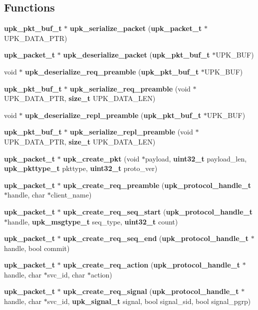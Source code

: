 \subsection*{Functions}
\begin{DoxyCompactItemize}
\item 
{\bf upk\_\-pkt\_\-buf\_\-t} $\ast$ {\bf upk\_\-serialize\_\-packet} ({\bf upk\_\-packet\_\-t} $\ast$UPK\_\-DATA\_\-PTR)
\item 
{\bf upk\_\-packet\_\-t} $\ast$ {\bf upk\_\-deserialize\_\-packet} ({\bf upk\_\-pkt\_\-buf\_\-t} $\ast$UPK\_\-BUF)
\item 
void $\ast$ {\bf upk\_\-deserialize\_\-req\_\-preamble} ({\bf upk\_\-pkt\_\-buf\_\-t} $\ast$UPK\_\-BUF)
\item 
{\bf upk\_\-pkt\_\-buf\_\-t} $\ast$ {\bf upk\_\-serialize\_\-req\_\-preamble} (void $\ast$UPK\_\-DATA\_\-PTR, {\bf size\_\-t} UPK\_\-DATA\_\-LEN)
\item 
void $\ast$ {\bf upk\_\-deserialize\_\-repl\_\-preamble} ({\bf upk\_\-pkt\_\-buf\_\-t} $\ast$UPK\_\-BUF)
\item 
{\bf upk\_\-pkt\_\-buf\_\-t} $\ast$ {\bf upk\_\-serialize\_\-repl\_\-preamble} (void $\ast$UPK\_\-DATA\_\-PTR, {\bf size\_\-t} UPK\_\-DATA\_\-LEN)
\item 
{\bf upk\_\-packet\_\-t} $\ast$ {\bf upk\_\-create\_\-pkt} (void $\ast$payload, {\bf uint32\_\-t} payload\_\-len, {\bf upk\_\-pkttype\_\-t} pkttype, {\bf uint32\_\-t} proto\_\-ver)
\item 
{\bf upk\_\-packet\_\-t} $\ast$ {\bf upk\_\-create\_\-req\_\-preamble} ({\bf upk\_\-protocol\_\-handle\_\-t} $\ast$handle, char $\ast$client\_\-name)
\item 
{\bf upk\_\-packet\_\-t} $\ast$ {\bf upk\_\-create\_\-req\_\-seq\_\-start} ({\bf upk\_\-protocol\_\-handle\_\-t} $\ast$handle, {\bf upk\_\-msgtype\_\-t} seq\_\-type, {\bf uint32\_\-t} count)
\item 
{\bf upk\_\-packet\_\-t} $\ast$ {\bf upk\_\-create\_\-req\_\-seq\_\-end} ({\bf upk\_\-protocol\_\-handle\_\-t} $\ast$handle, bool commit)
\item 
{\bf upk\_\-packet\_\-t} $\ast$ {\bf upk\_\-create\_\-req\_\-action} ({\bf upk\_\-protocol\_\-handle\_\-t} $\ast$handle, char $\ast$svc\_\-id, char $\ast$action)
\item 
{\bf upk\_\-packet\_\-t} $\ast$ {\bf upk\_\-create\_\-req\_\-signal} ({\bf upk\_\-protocol\_\-handle\_\-t} $\ast$handle, char $\ast$svc\_\-id, {\bf upk\_\-signal\_\-t} signal, bool signal\_\-sid, bool signal\_\-pgrp)
\item 

\end{DoxyCompactItemize}
